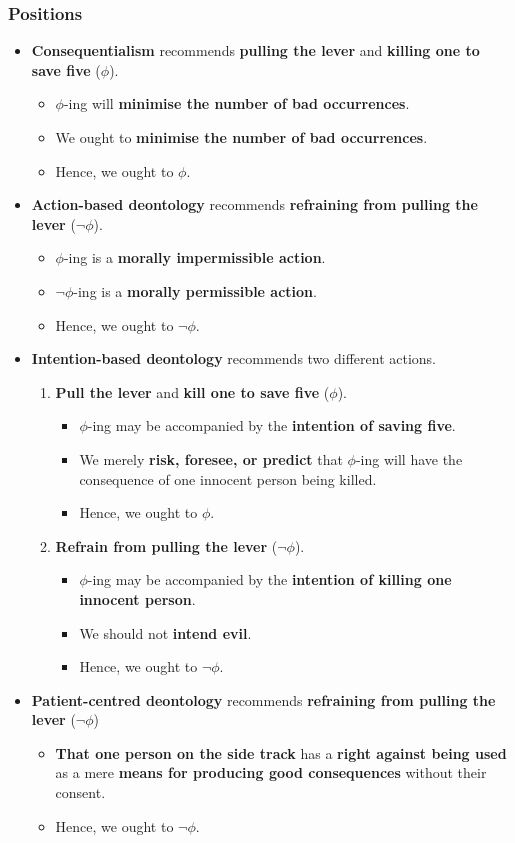 \documentclass[11pt]{article}
\begin{document}
 \newpage
\subsubsection{Positions}
\label{sec:orge710f68}
\begin{itemize}
\item \textbf{Consequentialism} recommends \textbf{pulling the lever} and \textbf{killing one to save five} (\(\phi\)).
\begin{itemize}
\item \(\phi\)-ing will \textbf{minimise the number of bad occurrences}.
\item We ought to \textbf{minimise the number of bad occurrences}.
\item Hence, we ought to \(\phi\).
\end{itemize}
\item \textbf{Action-based deontology} recommends \textbf{refraining from pulling the lever} (\(\neg \phi\)).
\begin{itemize}
\item \(\phi\)-ing is a \textbf{morally impermissible action}.
\item \(\neg \phi\)-ing is a \textbf{morally permissible action}.
\item Hence, we ought to \(\neg \phi\).
\end{itemize}
\item \textbf{Intention-based deontology} recommends two different actions.
\begin{enumerate}
\item \textbf{Pull the lever} and \textbf{kill one to save five} (\(\phi\)).
\begin{itemize}
\item \(\phi\)-ing may be accompanied by the \textbf{intention of saving five}.
\item We merely \textbf{risk, foresee, or predict} that \(\phi\)-ing will have the consequence of one innocent person being killed.
\item Hence, we ought to \(\phi\).
\end{itemize}
\item \textbf{Refrain from pulling the lever} (\(\neg \phi\)).
\begin{itemize}
\item \(\phi\)-ing may be accompanied by the \textbf{intention of killing one innocent person}.
\item We should not \textbf{intend evil}.
\item Hence, we ought to \(\neg \phi\).
\end{itemize}
\end{enumerate}
\item \textbf{Patient-centred deontology} recommends \textbf{refraining from pulling the lever} (\(\neg \phi\))
\begin{itemize}
\item \textbf{That one person on the side track} has a \textbf{right against being used} as a mere \textbf{means for producing good consequences} without their consent.
\item Hence, we ought to \(\neg \phi\).
\end{itemize}
\end{itemize}
\end{document}
